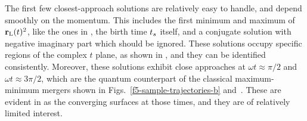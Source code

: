 The first few closest-approach solutions are relatively easy to handle, and depend smoothly on the momentum. This includes the first minimum and maximum of $\vb{r}_\mathrm{L}(t)^2$, like the ones in , the birth time ${t_s}$ itself, and a conjugate solution with negative imaginary part which should be ignored. These solutions occupy specific regions of the complex $t$ plane, as shown in , and they can be identified consistently. Moreover, these solutions exhibit close approaches at $\omega t\approx \pi/2$ and $\omega t \approx 3\pi/2$, which are the quantum counterpart of the classical maximum-minimum mergers shown in Figs.~\ref{f5-sample-trajectories-b} and~. These are evident in  as the converging surfaces at those times, and they are of relatively limited interest.



